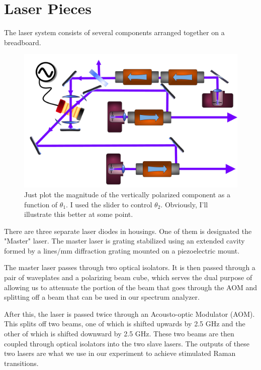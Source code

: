 \chapter{Laser Pieces}

The laser system consists of several components arranged together on a breadboard. 

\begin{figure}
    \centerline{\includegraphics[width=1\textwidth]{diagramOfSetup3}}
    \caption[Numerical method]{\label{fig:diagramOfSetup}
    Just plot the magnitude of the vertically polarized component as a function of $\theta_1$. I used the slider to control $\theta_2$. Obviously, I'll illustrate this better at some point.}
\end{figure}


There are three separate laser diodes in housings. One of them is designated the "Master" laser. The master laser is grating stabilized using an extended cavity formed by a  %
lines/mm diffraction grating mounted on a piezoelectric mount.  

The master laser passes through two optical isolators. It is then passed through a pair of waveplates and a polarizing beam cube, which serves the dual purpose of allowing us to attenuate the portion of the beam that goes through the AOM and splitting off a beam that can be used in our spectrum analyzer. 

After this, the laser is passed twice through an Acousto-optic Modulator (AOM). This splits off two beams, one of which is shifted upwards by 2.5 GHz and the other of which is shifted downward by 2.5 GHz. These two beams are then coupled through optical isolators into the two slave lasers. The outputs of these two lasers are what we use in our experiment to achieve stimulated Raman transitions. 


